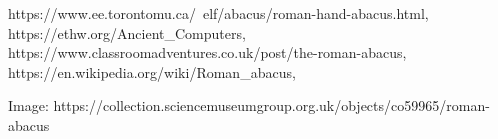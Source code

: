 https://www.ee.torontomu.ca/~elf/abacus/roman-hand-abacus.html,
https://ethw.org/Ancient_Computers,
https://www.classroomadventures.co.uk/post/the-roman-abacus,
https://en.wikipedia.org/wiki/Roman_abacus,

Image: https://collection.sciencemuseumgroup.org.uk/objects/co59965/roman-abacus